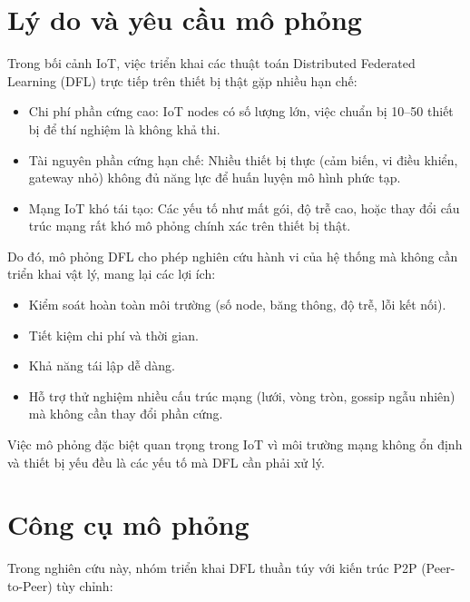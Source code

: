 
\section{Lý do và yêu cầu mô phỏng}

\hspace{0.6cm}Trong bối cảnh IoT, việc triển khai các thuật toán Distributed Federated Learning (DFL) trực tiếp trên thiết bị thật gặp nhiều hạn chế:

\begin{itemize}
    \item Chi phí phần cứng cao: IoT nodes có số lượng lớn, việc chuẩn bị 10–50 thiết bị để thí nghiệm là không khả thi.
    \item Tài nguyên phần cứng hạn chế: Nhiều thiết bị thực (cảm biến, vi điều khiển, gateway nhỏ) không đủ năng lực để huấn luyện mô hình phức tạp.
    \item Mạng IoT khó tái tạo: Các yếu tố như mất gói, độ trễ cao, hoặc thay đổi cấu trúc mạng rất khó mô phỏng chính xác trên thiết bị thật.
\end{itemize}
Do đó, mô phỏng DFL cho phép nghiên cứu hành vi của hệ thống mà không cần triển khai vật lý, mang lại các lợi ích:
\begin{itemize}
    \item Kiểm soát hoàn toàn môi trường (số node, băng thông, độ trễ, lỗi kết nối).
    \item Tiết kiệm chi phí và thời gian.
    \item Khả năng tái lập dễ dàng.
    \item Hỗ trợ thử nghiệm nhiều cấu trúc mạng (lưới, vòng tròn, gossip ngẫu nhiên) mà không cần thay đổi phần cứng.
\end{itemize}
Việc mô phỏng đặc biệt quan trọng trong IoT vì môi trường mạng không ổn định và thiết bị yếu đều là các yếu tố mà DFL cần phải xử lý.

\section{Công cụ mô phỏng}
\hspace{0.6cm}Trong nghiên cứu này, nhóm triển khai DFL thuần túy với kiến trúc P2P (Peer-to-Peer) tùy chỉnh:

